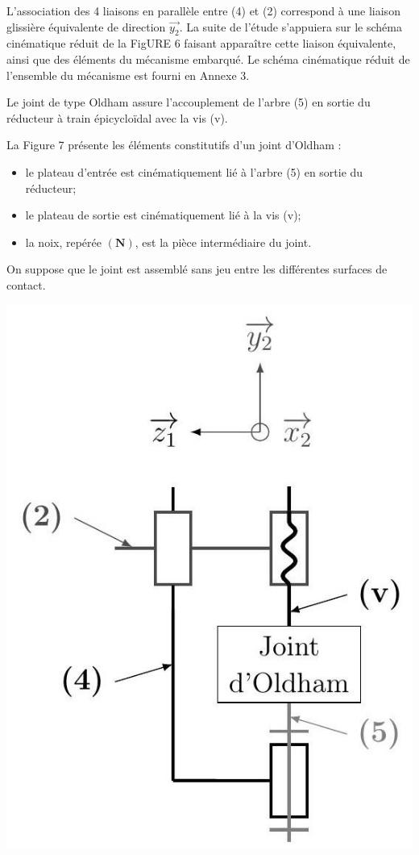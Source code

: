 \documentclass[10pt]{article}
\begin{document}
L'association des 4 liaisons en parallèle entre (4) et (2) correspond à une liaison glissière équivalente de direction $\overrightarrow{y_{2}}$. La suite de l'étude s'appuiera sur le schéma cinématique réduit de la FigURE 6 faisant apparaître cette liaison équivalente, ainsi que des éléments du mécanisme embarqué. Le schéma cinématique réduit de l'ensemble du mécanisme est fourni en Annexe 3.

Le joint de type Oldham assure l'accouplement de l'arbre (5) en sortie du réducteur à train épicycloïdal avec la vis (v).

La Figure 7 présente les éléments constitutifs d'un joint d'Oldham :

\begin{itemize}
  \item le plateau d'entrée est cinématiquement lié à l'arbre (5) en sortie du réducteur;
  \item le plateau de sortie est cinématiquement lié à la vis (v);
  \item la noix, repérée $(\mathbf{N})$, est la pièce intermédiaire du joint.
\end{itemize}

On suppose que le joint est assemblé sans jeu entre les différentes surfaces de contact.

\begin{center}
\includegraphics[max width=\textwidth]{2024_04_26_3285cfc264024262add0g-06(1)}
\end{center}
\end{document}
